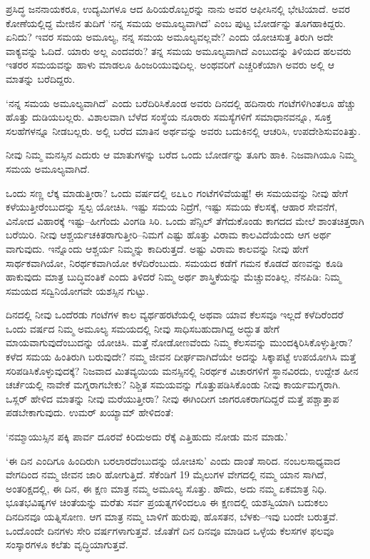 
ಪ್ರಸಿದ್ಧ ಜನನಾಯಕರೂ, ಉದ್ಯಮಿಗಳೂ ಆದ ಹಿರಿಯರೊಬ್ಬರನ್ನು ನಾನು ಅವರ ಆಫೀಸಿನಲ್ಲಿ ಭೇಟಿಯಾದೆ. ಅವರ ಕೋಣೆಯಲ್ಲಿದ್ದ ಮೇಜಿನ ತುದಿಗೆ ‘ನನ್ನ ಸಮಯ ಅಮೂಲ್ಯವಾಗಿದೆ’ ಎಂಬ ಪುಟ್ಟ ಬೋರ್ಡನ್ನು ತೂಗಹಾಕಿದ್ದರು. ಏನಿದು? ಇವರ ಸಮಯ ಅಮೂಲ್ಯ, ನನ್ನ ಸಮಯ ಅಮೂಲ್ಯವಲ್ಲವೇ? ಎಂದು ಯೋಚಿಸುತ್ತ ತಿರುಗಿ ಅದೇ ವಾಕ್ಯವನ್ನು ಓದಿದೆ. ಯಾರು ಅಲ್ಲ ಎಂದವರು? ತನ್ನ ಸಮಯ ಅಮೂಲ್ಯವಾಗಿದೆ ಎಂಬುದನ್ನು ತಿಳಿಯದ ಹಲವರು ಇತರರ ಸಮಯವನ್ನು ಹಾಳು ಮಾಡಲೂ ಹಿಂಜರಿಯುವುದಿಲ್ಲ. ಅಂಥವರಿಗೆ ಎಚ್ಚರಿಕೆಯಾಗಿ ಅವರು ಅಲ್ಲಿ ಆ ಮಾತನ್ನು ಬರೆದಿದ್ದರು.

‘ನನ್ನ ಸಮಯ ಅಮೂಲ್ಯವಾಗಿದೆ’ ಎಂದು ಬರೆದಿರಿಸಿಕೊಂಡ ಅವರು ದಿನದಲ್ಲಿ ಹದಿನಾರು ಗಂಟೆಗಳಿಗಿಂತಲೂ ಹೆಚ್ಚು ಹೊತ್ತು ದುಡಿಯಬಲ್ಲರು. ವಿಶಾಲವಾಗಿ ಬೆಳೆದ ಸಂಸ್ಥೆಯ ನೂರಾರು ಸಮಸ್ಯೆಗಳಿಗೆ ಸಮಾಧಾನವನ್ನೂ, ಸೂಕ್ತ ಸಲಹೆಗಳನ್ನೂ ನೀಡಬಲ್ಲರು. ಅಲ್ಲಿ ಬರೆದ ಮಾತಿನ ಅರ್ಥವನ್ನು ಅವರು ಬದುಕಿನಲ್ಲಿ ಆಚರಿಸಿ, ಉಪದೇಶಿಸುವಂತಿತ್ತು.

ನೀವು ನಿಮ್ಮ ಮನಸ್ಸಿನ ಎದುರು ಆ ಮಾತುಗಳನ್ನು ಬರೆದ ಒಂದು ಬೋರ್ಡನ್ನು ತೂಗು ಹಾಕಿ. ನಿಜವಾಗಿಯೂ ನಿಮ್ಮ ಸಮಯ ಅಮೂಲ್ಯವಾಗಿದೆ.

ಒಂದು ಸಣ್ಣ ಲೆಕ್ಕ ಮಾಡುತ್ತೀರಾ? ಒಂದು ವರ್ಷದಲ್ಲಿ ೮೭೬೦ ಗಂಟೆಗಳಿವೆಯಷ್ಟೆ! ಈ ಸಮಯವನ್ನು ನೀವು ಹೇಗೆ ಕಳೆಯುತ್ತೀರೆಂಬುದನ್ನು ಸ್ವಲ್ಪ ಯೋಚಿಸಿ. ಇಷ್ಟು ಸಮಯ ನಿದ್ರೆಗೆ, ಇಷ್ಟು ಸಮಯ ಕೆಲಸಕ್ಕೆ, ಆಹಾರ ಸೇವನೆಗೆ, ವಿನೋದ ವಿಹಾರಕ್ಕೆ ಇಷ್ಟು–ಹೀಗೆಂದು ವಿಂಗಡಿ ಸಿರಿ. ಒಂದು ಪೆನ್ಸಿಲ್ ತೆಗೆದುಕೊಂಡು ಕಾಗದದ ಮೇಲೆ ಶಾಂತಚಿತ್ತರಾಗಿ ಬರೆಯಿರಿ. ನೀವು ಆಶ್ಚರ್ಯಚಕಿತರಾಗುತ್ತೀರಿ–ನಿಮಗೆ ಎಷ್ಟು ಹೊತ್ತು ವಿರಾಮ ಕಾಲವಿದೆಯೆಂದು ಆಗ ಅರ್ಥ ವಾಗುವುದು. ಇನ್ನೊಂದು ಆಶ್ಚರ್ಯ ನಿಮ್ಮನ್ನು ಕಾದಿರುತ್ತದೆ. ಅಷ್ಟು ವಿರಾಮ ಕಾಲವನ್ನು ನೀವು ಹೇಗೆ ಸಾರ್ಥಕವಾಗಿಯೋ, ನಿರರ್ಥಕವಾಗಿಯೋ ಕಳೆದಿರೆಂಬುದು. ಸಮಯದ ಕಡೆಗೆ ಗಮನ ಕೊಡದೆ ಹಣವನ್ನು ಕೂಡಿ ಹಾಕುವುದು ಮಾತ್ರ ಬುದ್ಧಿವಂತಿಕೆ ಎಂದು ತಿಳಿದರೆ ನಿಮ್ಮ ಅರ್ಥ ಶಾಸ್ತ್ರಿಕೆಯನ್ನು ಮೆಚ್ಚುವಂತಿಲ್ಲ. ನೆನಪಿಡಿ: ನಿಮ್ಮ ಸಮಯದ ಸದ್ವಿನಿಯೋಗವೇ ಯಶಸ್ಸಿನ ಗುಟ್ಟು.

ದಿನದಲ್ಲಿ ನೀವು ಒಂದೆರಡು ಗಂಟೆಗಳ ಕಾಲ ವ್ಯರ್ಥಹರಟೆಯಲ್ಲಿ ಅಥವಾ ಯಾವ ಕೆಲಸವೂ ಇಲ್ಲದೆ ಕಳೆದಿರೆಂದರೆ ಒಂದು ವರ್ಷದ ನಿಮ್ಮ ಅಮೂಲ್ಯ ಸಮಯದಲ್ಲಿ ನೀವು ಸಾಧಿಸಬಹುದಾಗಿದ್ದ ಅದ್ಭುತ ಹೇಗೆ ಮಾಯವಾಗುವುದೆಂಬುದನ್ನು ಯೋಚಿಸಿ. ಮತ್ತೆ ನೋಡೋಣವೆಂದು ನಿಮ್ಮ ಕೆಲಸವನ್ನು ಮುಂದಕ್ಕಿರಿಸಿಕೊಳ್ಳುತ್ತೀರಾ? ಕಳೆದ ಸಮಯ ಹಿಂತಿರುಗಿ ಬರುವುದೇ? ನಮ್ಮ ಜೀವನ ದೀರ್ಘವಾಗಿದೆಯೇ ಅದನ್ನು ಸಿಕ್ಕಾಪಟ್ಟೆ ಉಪಯೋಗಿಸಿ ಮತ್ತೆ ಸರಿಪಡಿಸಿಕೊಳ್ಳುವುದಕ್ಕೆ? ನಿಜವಾದ ಮಿತವ್ಯಯಿಯ ಮನಸ್ಸಿನಲ್ಲಿ ನಿರರ್ಥಕ ವಿಚಾರಗಳಿಗೆ ಸ್ಥಾನವಿರದು, ಉದ್ದೇಶ ಹೀನ ಚರ್ಚೆಯಲ್ಲಿ ನಾವೇಕೆ ಮಗ್ನರಾಗಬೇಕು? ನಿಶ್ಚಿತ ಸಮಯವನ್ನು ಗೊತ್ತುಪಡಿಸಿಕೊಂಡು ನೀವು ಕಾರ್ಯಮಗ್ನರಾಗಿ. ಒಸ್ಲರ್ ಹೇಳಿದ ಮಾತನ್ನು ನೀವು ಮರೆಯುತ್ತೀರಾ? ನೀವು ಈಗಿಂದೀಗ ಜಾಗರೂಕರಾಗದಿದ್ದರೆ ಮತ್ತೆ ಪಶ್ಚಾತ್ತಾಪ ಪಡಬೇಕಾಗುವುದು. ಉಮರ್ ಖಯ್ಯಾಮ್ ಹೇಳಿದಂತೆ:

‘ನಮ್ಮಾಯುಸ್ಸಿನ ಪಕ್ಕಿ ಪಾರ್ವ ದೂರವೆ ಕಿರಿದುಅದು ರೆಕ್ಕೆ ಎತ್ತಿಹುದು ನೋಡು ಮನ ಮಾಡು.’

‘ಈ ದಿನ ಎಂದಿಗೂ ಹಿಂದಿರುಗಿ ಬರಲಾರದೆಂಬುದನ್ನು ಯೋಚಿಸು’ ಎಂದು ದಾಂತೆ ಸಾರಿದ. ನಂಬಲಸಾಧ್ಯವಾದ ವೇಗದಿಂದ ನಮ್ಮ ಜೀವನ ಜಾರಿ ಹೋಗುತ್ತಿದೆ. ಸೆಕೆಂಡಿಗೆ 19 ಮೈಲುಗಳ ವೇಗದಲ್ಲಿ ನಮ್ಮ ಯಾನ ಸಾಗಿದೆ, ಅಂತರಿಕ್ಷದಲ್ಲಿ, ಈ ದಿನ, ಈ ಕ್ಷಣ ಮಾತ್ರ ನಮ್ಮ ಅಮೂಲ್ಯ ಸೊತ್ತು. ಹೌದು, ಅದು ನಮ್ಮ ಏಕಮಾತ್ರ ನಿಧಿ. ಭೂತಭವಿಷ್ಯಗಳ ಚಿಂತೆಯನ್ನು ಮರೆತು ಸರ್ವ ಪ್ರಯತ್ನಗಳಿಂದಲೂ ಈ ಕ್ಷಣದಲ್ಲಿ ಯಶಸ್ವಿಯಾಗಿ ಬದುಕಲು ದಿನದಿನವೂ ಯತ್ನಿಸೋಣ. ಆಗ ಮಾತ್ರ ನಮ್ಮ ಬಾಳಿಗೆ ಹುರುಪು, ಹೊಸತನ, ಬೆಳಕು–ಇವು ಬಂದೇ ಬರುತ್ತವೆ. ಒಂದೊಂದೇ ದಿನಗಳು ಸೇರಿ ವರ್ಷಗಳಾಗುತ್ತವೆ. ಜೊತೆಗೆ ದಿನ ದಿನವೂ ಮಾಡಿದ ಒಳ್ಳೆಯ ಕೆಲಸಗಳ ಫಲವೂ ಸಂಸ್ಕಾರಗಳೂ ಕಲೆತು ವೃದ್ಧಿಯಾಗುತ್ತವೆ.

